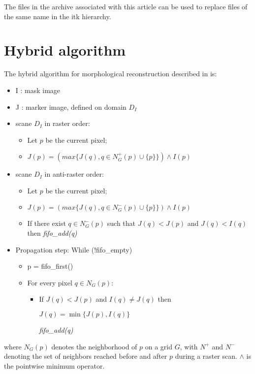 \documentclass{InsightArticle}
\begin{document}
The files in the archive associated with this article can be used to
replace files of the same name in the itk hierarchy.

\section{Hybrid algorithm}
The hybrid algorithm for morphological reconstruction described in \cite{Vincent93a} is:

\begin{itemize}
\item I : mask image
\item J : marker image, defined on domain $D_I$
\item scane $D_I$ in raster order:
   \begin{itemize}
	\item Let $p$ be the current pixel;
	\item $J(p) = (max\{J(q), q \in N^+_G(p) \cup \{p\}\}) \wedge I(p)$
   \end{itemize}
\item scane $D_I$ in anti-raster order:
   \begin{itemize}
	\item Let $p$ be the current pixel;
	\item $J(p) = (max\{J(q), q \in N^-_G(p) \cup \{p\}\}) \wedge I(p)$
	\item If there exist $q \in  N^-_G(p)$ such that $J(q) < J(p)$ and $J(q) < I(q)$ then {\em fifo\_add(q)}
   \end{itemize}
\item Propagation step: While (!fifo\_empty)
   \begin{itemize}
	\item p = fifo\_first()
        \item For every pixel $q \in N_G(p)$:
        \begin{itemize}
	\item If $J(q) < J(p)$ and $I(q) \ne J(q)$ then

	      $J(q) = \min\{J(p),I(q)\}$

         	{\em fifo\_add(q)}
		
	\end{itemize}
   \end{itemize}
\end{itemize}

where $N_G(p)$ denotes the neighborhood of $p$ on a grid $G$, with
$N^+$ and $N^-$ denoting the set of neighbors reached before and after
$p$ during a raster scan. $\wedge$ is the pointwise minimum operator.
\end{document}
